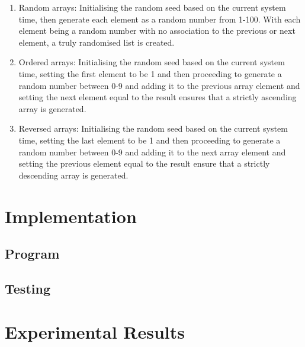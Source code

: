 \documentclass[]{article}
\begin{document}
\begin{enumerate}
	\item Random arrays: Initialising the random seed based on the current system time, then generate each element as a random number from 1-100. With each element being a random number with no association to the previous or next element, a truly randomised list is created.
	\item Ordered arrays: Initialising the random seed based on the current system time, setting the first element to be 1 and then proceeding to generate a random number between 0-9 and adding it to the previous array element and setting the next element equal to the result ensures that a strictly ascending array is generated.
	\item Reversed arrays: Initialising the random seed based on the current system time, setting the last element to be 1 and then proceeding to generate a random number between 0-9 and adding it to the next array element and setting the previous element equal to the result ensure that a strictly descending array is generated.
\end{enumerate}
\section{Implementation}
\subsection{Program}
\subsection{Testing}
\section{Experimental Results}
\end{document}
